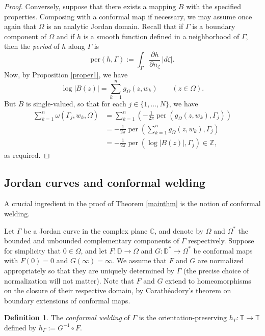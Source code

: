 \documentclass{amsart}
\theoremstyle{plain}
\theoremstyle{definition}
\newtheorem{definition}[theorem]{Definition}
\theoremstyle{remark}
\newcommand{\mC}{\mathbb{C}}
\newcommand{\mD}{\mathbb{D}}
\newcommand{\mT}{\mathbb{T}}
\begin{document}
\begin{proof}
Conversely, suppose that there exists a mapping $B$ with the specified properties. Composing with a conformal map if necessary, we may assume once again that $\Omega$ is an analytic Jordan domain. Recall that if $\Gamma$ is a boundary component of $\Omega$ and if $h$ is a smooth function defined in a neighborhood of $\Gamma$, then the \textit{period} of $h$ along $\Gamma$ is
$$
\mathrm{per} (h , \Gamma ) := \int_{\Gamma} \frac{\partial h}{\partial n_\zeta}\, |d\zeta| .
$$
Now, by Proposition \ref{proper1}, we have
$$
\log{|B(z)|} = \sum_{k=1}^n g_{\Omega}(z,w_k) \qquad (z \in \Omega).
$$
But $B$ is single-valued, so that for each $j \in \{1, \dots, N\}$, we have
\begin{align*}
\sum_{k=1}^n \omega(\Gamma_j,w_k,\Omega) &= \sum_{k=1}^n \left(- \frac{1}{2\pi} \operatorname{per}(g_{\Omega}(z,w_k), \Gamma_j)\right)\\
&= - \frac{1}{2\pi} \operatorname{per}\left(\sum_{k=1}^n g_{\Omega}(z,w_k), \Gamma_j\right)\\
&= - \frac{1}{2\pi} \operatorname{per}(\log{|B(z)|}, \Gamma_j) \in \mathbb{Z},
\end{align*}
as required.
\end{proof}


\subsection{Jordan curves and conformal welding}

A crucial ingredient in the proof of Theorem \ref{mainthm} is the notion of conformal welding.

Let $\Gamma$ be a Jordan curve in the complex plane $\mC$, and denote by $\Omega$ and $\Omega^*$ the bounded and unbounded complementary components of $\Gamma$ respectively. Suppose for simplicity that $0 \in \Omega$, and let $F:\mD \to \Omega$ and $G:\mD^* \to \Omega^*$ be conformal maps with $F(0)=0$ and $G(\infty)=\infty$. We assume that $F$ and $G$ are normalized appropriately so that they are uniquely determined by $\Gamma$ (the precise choice of normalization will not matter). Note that $F$ and $G$ extend to homeomorphisms on the closure of their respective domain, by Carath\'eodory's theorem on boundary extensions of conformal maps.

\begin{definition}
The \textit{conformal welding} of $\Gamma$ is the orientation-preserving $h_\Gamma: \mT \to \mT$ defined by $h_\Gamma:=G^{-1} \circ F$.
\end{definition}
\end{document}

